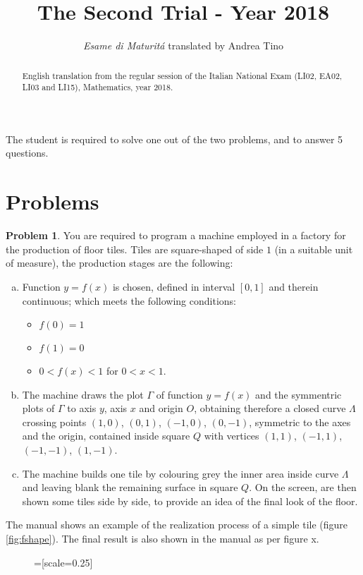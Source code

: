 \documentclass[a4paper,12pt,reqno]{amsart}
\title{The Second Trial - Year 2018}
\author{\emph{Esame di Maturit\'a} translated by Andrea Tino}
\theoremstyle{definition}
\newtheorem{problem}{Problem}
\begin{document}
\begin{abstract}
English translation from the regular session of the Italian National Exam
(LI02, EA02, LI03 and LI15), Mathematics, year 2018.
\end{abstract}

\maketitle

The student is required to solve one out of the two problems, and to answer 5 questions. 

\section{Problems}

\begin{problem}
You are required to program a machine employed in a factory for the production of floor tiles.
Tiles are square-shaped of side $1$ (in a suitable unit of measure), the production stages are the following:
\begin{enumerate}[(a)]
\item Function $y=f(x)$ is chosen, defined in interval $[0,1]$ and therein continuous; which meets the following
conditions:
\begin{itemize}
\item \label{itm:1} $f(0) = 1$
\item \label{itm:2} $f(1) = 0$
\item \label{itm:3} $0 < f(x) < 1$ for $0 < x < 1$.
\end{itemize}
\item The machine draws the plot $\Gamma$ of function $y=f(x)$ and the symmentric plots of $\Gamma$
to axis $y$, axis $x$ and origin $O$, obtaining therefore a closed curve $\Lambda$ crossing points
$(1,0)$, $(0,1)$, $(-1,0)$, $(0,-1)$, symmetric to the axes and the origin, contained inside square $Q$
with vertices $(1,1)$, $(-1,1)$, $(-1,-1)$, $(1,-1)$.
\item The machine builds one tile by colouring grey the inner area inside curve $\Lambda$ and leaving blank
the remaining surface in square $Q$. On the screen, are then shown some tiles side by side, to provide an idea
of the final look of the floor.
\end{enumerate}
The manual shows an example of the realization process of a simple tile (figure \ref{fig:fshape}). The
final result is also shown in the manual as per figure x.
%
   \begin{figure}
   \centering
{}=[scale=0.25]
\end{figure}
\end{problem}
\end{document}
